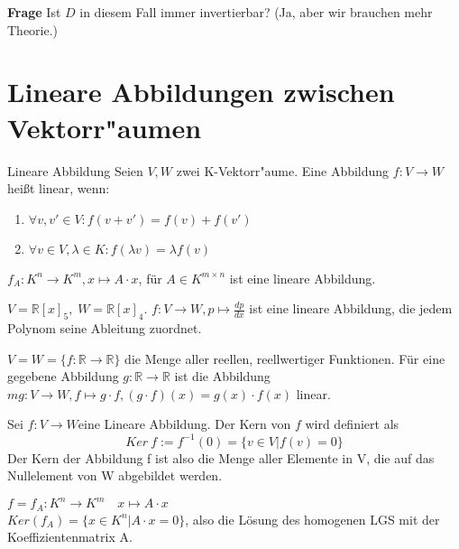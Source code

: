 \documentclass[oneside,fontsize=11pt,paper=a4,BCOR=0mm,DIV=12,automark,headsepline]{scrbook}
\theoremstyle{remark}
\theoremstyle{definition}
\theoremstyle{definition}
\theoremstyle{remark}
\begin{document}
\textbf{Frage} Ist \(D\) in diesem Fall immer invertierbar? (Ja, aber wir brauchen mehr Theorie.)

\chapter{Lineare Abbildungen zwischen Vektorr"aumen}
\label{sec:orgb4c03c4}
\begin{definition}{Lineare Abbildung}{}
  Seien \(V, W\) zwei K-Vektorr"aume. Eine Abbildung \(f: V\rightarrow W\) heißt linear, wenn:

  \begin{enumerate}
  \item \(\forall v,v' \in V: f(v+v')=f(v)+f(v')\)
  \item \(\forall v\in V, \lambda \in K: f(\lambda v)=\lambda f(v)\)
  \end{enumerate}

\end{definition}

\begin{exa}
  $f_{A}: K^n\rightarrow K^m, x\mapsto A\cdot x$, für $A \in K^{m\times n}$ ist eine lineare Abbildung.
\end{exa}

\begin{exa}
  \(V=\mathbb{R}[x]_5,\;W=\mathbb{R}[x]_4\). $f: V\rightarrow W, p \mapsto \frac{dp}{dx}$ ist eine lineare Abbildung, die jedem Polynom seine Ableitung zuordnet.
\end{exa}

\begin{exa}
  $V=W=\{f:\mathbb{R}\rightarrow\mathbb{R}\}$ die Menge aller reellen, reellwertiger Funktionen. Für eine gegebene Abbildung $g:\mathbb{R}\rightarrow\mathbb{R}$ ist die Abbildung $mg: V\rightarrow W, f\mapsto g\cdot f, (g\cdot f)(x)=g(x)\cdot f(x)$ linear.
\end{exa}

\begin{definition}{}{}
  Sei $f:V\rightarrow W$eine Lineare Abbildung. Der Kern von \(f\) wird definiert als \[Ker\: f := f^{-1}(0) = \{v\in V|f(v)=0\}\] Der Kern der Abbildung f ist also die Menge aller Elemente in V, die auf das Nullelement von W abgebildet werden.
\end{definition}

\begin{exa}
  $f=f_A: K^n\rightarrow K^m \quad x\mapsto A\cdot x$\\
  $Ker (f_A) = \{x\in K^n|A\cdot x = 0\}$, also die Lösung des homogenen LGS mit der Koeffizientenmatrix A.
\end{exa}
\end{document}
